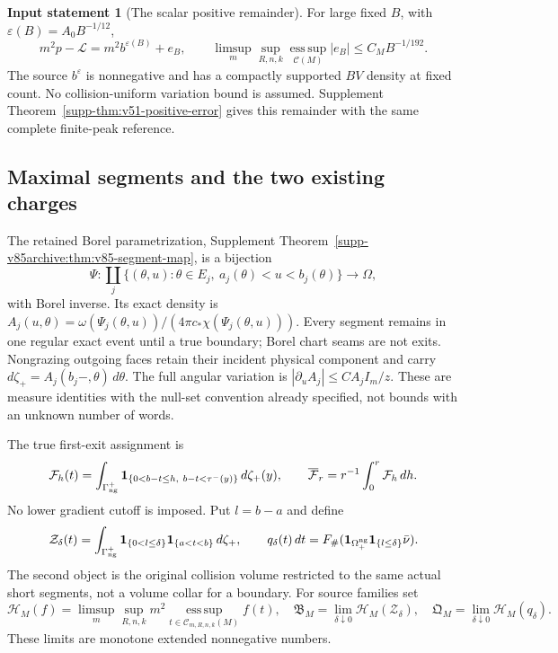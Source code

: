 \documentclass[11pt,reqno]{amsart}
\numberwithin{equation}{section}
\theoremstyle{definition}
\newtheorem{inputstatement}[theorem]{Input statement}
\theoremstyle{remark}\newtheorem{remark}[theorem]{Remark}
\newcommand{\one}{\mathbf1}\newcommand{\dd}{\,\mathrm d}
\newcommand{\esssup}{\operatorname*{ess\,sup}}
\begin{document}
\begin{inputstatement}[The scalar positive remainder]
\label{input:v83-scalar}
For large fixed $B$, with $\varepsilon(B)=A_0B^{-1/12}$,
\begin{equation}\label{eq:v76-remainder}
 m^2p-\mathcal L=m^2b^{\varepsilon(B)}+e_B,\qquad
 \limsup_m\sup_{R,n,k}\esssup_{\mathcal C(M)}|e_B|
                                      \le C_MB^{-1/192}.
\end{equation}
The source $b^\varepsilon$ is nonnegative and has a compactly supported
$BV$ density at fixed count. No collision-uniform variation bound is
assumed. Supplement Theorem~\ref{supp-thm:v51-positive-error} gives
this remainder with the same complete finite-peak reference.
\end{inputstatement}

\subsection{Maximal segments and the two existing charges}
The retained Borel parametrization, Supplement
Theorem~\ref{supp-v85archive:thm:v85-segment-map}, is a bijection
\[
 \Psi:\coprod_j\{(\theta,u):\theta\in E_j,\ a_j(\theta)<u<b_j(\theta)\}
                      \longrightarrow\Omega,
\]
with Borel inverse. Its exact density is
$A_j(u,\theta)=\omega(\Psi_j(\theta,u))/(4\pi c_*\chi(\Psi_j(\theta,u)))$.
Every segment remains in one regular exact event until a true boundary;
Borel chart seams are not exits. Nongrazing outgoing faces retain their
incident physical component and carry
$d\zeta_+=A_j(b_j-,\theta)\,d\theta$. The full angular variation is
$|\partial_u A_j|\le C A_j I_m/z$.
These are measure identities with the null-set convention already
specified, not bounds with an unknown number of words.

The true first-exit assignment is
\[
 \mathcal F_h(t)=\int_{\Gamma_{\rm ng}^+}
  \one_{\{0<b-t\le h,\ b-t<\tau^-(y)\}}\,d\zeta_+(y),\qquad
 \overline{\mathcal F}_r=r^{-1}\int_0^r\mathcal F_h\,dh.
\]
No lower gradient cutoff is imposed. Put $l=b-a$ and define
\[
 \mathcal Z_\delta(t)=\int_{\Gamma_{\rm ng}^+}
       \one_{\{0<l\le\delta\}}\one_{\{a<t<b\}}\,d\zeta_+,
 \qquad q_\delta(t)\,dt
  =F_\#(\one_{\Omega_+^{\rm ng}}\one_{\{l\le\delta\}}\bar\nu).
\]
The second object is the original collision volume restricted to the
same actual short segments, not a volume collar for a boundary.
For source families set
\[
 \mathcal H_M(f)=\limsup_m\sup_{R,n,k}m^2
            \esssup_{t\in\mathcal C_{m,R,n,k}(M)}f(t),
 \quad \mathfrak B_M=\lim_{\delta\downarrow0}\mathcal H_M(\mathcal Z_\delta),
 \quad \mathfrak Q_M=\lim_{\delta\downarrow0}\mathcal H_M(q_\delta).
\]
These limits are monotone extended nonnegative numbers.
\end{document}
